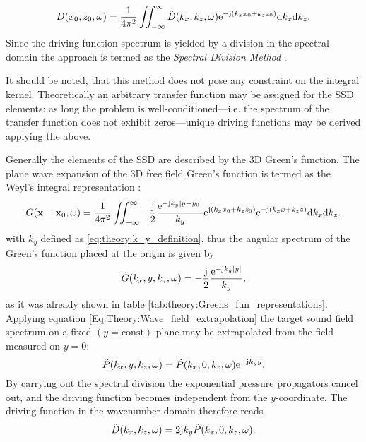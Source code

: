\begin{equation}
D(x_0,z_0,\omega) = \frac{1}{4\pi^2} \iint_{-\infty}^{\infty} \tilde{D}(k_x,k_z, \omega) \mathrm{e}^{-\mathrm{j} (k_x x_0 + k_z z_0)} \mathrm{d} k_x \mathrm{d} k_z.
\label{Eq:Theory:Dkx_inverse_Fourier}
\end{equation}
Since the driving function spectrum is yielded by a division in the spectral domain the approach is termed as the \emph{Spectral Division Method} \cite{Ahrens2010a, Ahrens2012:Ambisonics_for_planar_linear, Ahrens2011:icassp, Ahrens2010:Ambisonics_w_planar_linear}.

It should be noted, that this method does not pose any constraint on the integral kernel. Theoretically an arbitrary transfer function may be assigned for the SSD elements: as long the problem is well-conditioned---i.e. the spectrum of the transfer function does not exhibit zeros---unique driving functions may be derived applying the above.

\vspace{3mm}
Generally the elements of the SSD are described by the 3D Green's function. The plane wave expansion of the 3D free field Green's function is termed as the Weyl's integral representation \cite{Williams1999, Lalor1969}:
\begin{equation}
G(\mathbf{x} - \mathbf{x}_0,\omega ) = \frac{1}{4\pi^2} \iint_{-\infty}^{\infty} -\frac{\mathrm{j}}{2}\frac{\mathrm{e}^{ -\mathrm{j} k_y  | y - y_0 |  }}{ k_y }
\mathrm{e}^{\mathrm{j} (k_x x_0 + k_z z_0)} \mathrm{e}^{-\mathrm{j} (k_x x + k_z z)} \mathrm{d} k_x \mathrm{d} k_z.
\label{Eq:Theory:Weyls_integral}
\end{equation}
with $k_y$ defined as \eqref{eq:theory:k_y_definition}, thus the angular spectrum of the Green's function placed at the origin is given by
\begin{equation}
\tilde{G}(k_x,y,k_z,\omega) =-\frac{\mathrm{j}}{2}\frac{\mathrm{e}^{ -\mathrm{j} k_y  | y |  }}{ k_y },
\end{equation}
as it was already shown in table \ref{tab:theory:Greens_fun_representations}.
Applying equation \eqref{Eq:Theory:Wave_field_extrapolation} the target sound field spectrum on a fixed $(y=\mathrm{const})$ plane may be extrapolated from the field measured on $y=0$:
\begin{equation}
\tilde{P}(k_x,y,k_z,\omega) = \tilde{P}(k_x,0,k_z,\omega) \mathrm{e}^{- \mathrm{j} k_y y}.
\label{Eq:Theory:Wave_field_extrapolation_2}
\end{equation}
By carrying out the spectral division the exponential pressure propagators cancel out, and the driving function becomes independent from the $y$-coordinate. The driving function in the wavenumber domain therefore reads
\begin{equation}
\tilde{D}(k_x,k_z,\omega) = 2\mathrm{j} k_y \tilde{P}(k_x,0,k_z,\omega).
\label{Eq:Theory:Planar_explicit_driv_fun}
\end{equation}

